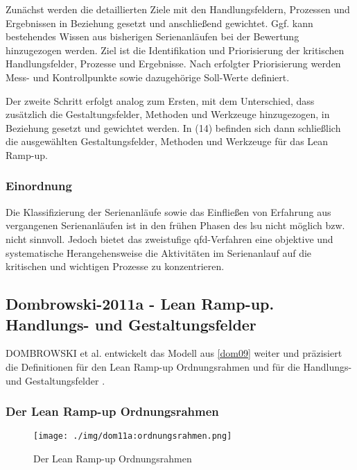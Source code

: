 Zunächst werden die detaillierten Ziele mit den Handlungsfeldern, Prozessen und Ergebnissen in Beziehung gesetzt und anschließend gewichtet. Ggf. kann bestehendes Wissen aus bisherigen Serienanläufen bei der Bewertung hinzugezogen werden. 
Ziel ist die Identifikation und Priorisierung der kritischen Handlungsfelder, Prozesse und Ergebnisse.
Nach erfolgter Priorisierung werden Mess- und Kontrollpunkte sowie dazugehörige Soll-Werte definiert. 

Der zweite Schritt erfolgt analog zum Ersten, mit dem Unterschied, dass zusätzlich die Gestaltungsfelder, Methoden und Werkzeuge hinzugezogen, in Beziehung gesetzt und gewichtet werden. 
In (14) befinden sich dann schließlich die ausgewählten Gestaltungsfelder, Methoden und Werkzeuge für das Lean Ramp-up. 

\subsubsection{Einordnung}
Die Klassifizierung der Serienanläufe sowie das Einfließen von Erfahrung aus vergangenen Serienanläufen ist in den frühen Phasen des \gls{lsu} nicht möglich bzw. nicht sinnvoll. Jedoch bietet das zweistufige \gls{qfd}-Verfahren eine objektive und systematische Herangehensweise die Aktivitäten im Serienanlauf auf die kritischen und wichtigen Prozesse zu konzentrieren. 

\subsection*{Dombrowski-2011a - Lean Ramp-up. Handlungs- und Gestaltungsfelder}\label{sec:dom11a}

DOMBROWSKI et al. entwickelt das Modell aus \ref{dom09} %
weiter und präzisiert die Definitionen für den Lean Ramp-up Ordnungsrahmen und für die Handlungs- und Gestaltungsfelder \cite{Dombrowski2011a}. 

\subsubsection{Der Lean Ramp-up Ordnungsrahmen}\label{sec:dom11a:ordnungsrahmen}
\begin{figure}[h]
 \centering
 \texttt{[image: ./img/dom11a:ordnungsrahmen.png]}
 \caption{Der Lean Ramp-up Ordnungsrahmen \cite{Dombrowski2011a}}
 \label{fig:dom11a:ordnungsrahmen}
\end{figure}

